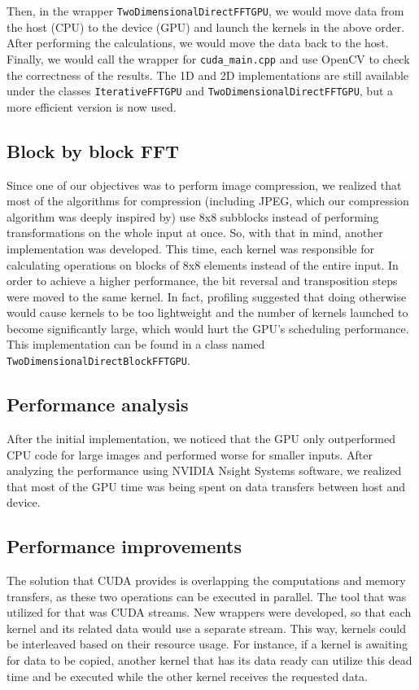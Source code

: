 Then, in the wrapper \texttt{Two\-Dimensional\-Direct\-FFT\-GPU}, we would move data from the host (CPU) to the device (GPU) and launch the kernels in the above order. After performing the calculations, we would move the data back to the host. Finally, we would call the wrapper for \texttt{cuda\_main.cpp} and use OpenCV to check the correctness of the results. The 1D and 2D implementations are still available under the classes \texttt{Iterative\-FFT\-GPU} and \texttt{Two\-Dimensional\-Direct\-FFT\-GPU}, but a more efficient version is now used.

\subsection{Block by block FFT}
Since one of our objectives was to perform image compression, we realized that most of the algorithms for compression (including JPEG, which our compression algorithm was deeply inspired by) use 8x8 subblocks instead of performing transformations on the whole input at once. So, with that in mind, another implementation was developed. This time, each kernel was responsible for calculating operations on blocks of 8x8 elements instead of the entire input. In order to achieve a higher performance, the bit reversal and transposition steps were moved to the same kernel. In fact, profiling suggested that doing otherwise would cause kernels to be too lightweight and the number of kernels launched to become significantly large, which would hurt the GPU's scheduling performance. This implementation can be found in a class named \texttt{Two\-Dimensional\-Direct\-Block\-FFT\-GPU}.

\subsection{Performance analysis}
After the initial implementation, we noticed that the GPU only outperformed CPU code for large images and performed worse for smaller inputs. After analyzing the performance using NVIDIA Nsight Systems software, we realized that most of the GPU time was being spent on data transfers between host and device. 

\subsection{Performance improvements}
The solution that CUDA provides is overlapping the computations and memory transfers, as these two operations can be executed in parallel. The tool that was utilized for that was CUDA streams. New wrappers were developed, so that each kernel and its related data would use a separate stream. This way, kernels could be interleaved based on their resource usage. For instance, if a kernel is awaiting for data to be copied, another kernel that has its data ready can utilize this dead time and be executed while the other kernel receives the requested data.

